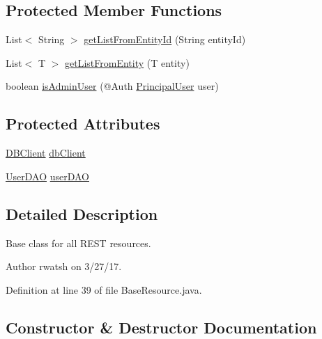 \subsection*{Protected Member Functions}
\begin{DoxyCompactItemize}
\item 
List$<$ String $>$ \hyperlink{classedu_1_1sjsu_1_1amigo_1_1user_1_1rest_1_1_base_resource_a54d169ff7906ac0b636c4577a09d79cd}{get\+List\+From\+Entity\+Id} (String entity\+Id)
\item 
List$<$ T $>$ \hyperlink{classedu_1_1sjsu_1_1amigo_1_1user_1_1rest_1_1_base_resource_aa035eb9e4d83221d9ac9eb937660a063}{get\+List\+From\+Entity} (T entity)
\item 
boolean \hyperlink{classedu_1_1sjsu_1_1amigo_1_1user_1_1rest_1_1_base_resource_a759e6d3b620efd2d6194f718b51e2501}{is\+Admin\+User} (@Auth \hyperlink{classedu_1_1sjsu_1_1amigo_1_1user_1_1auth_1_1_principal_user}{Principal\+User} user)
\end{DoxyCompactItemize}
\subsection*{Protected Attributes}
\begin{DoxyCompactItemize}
\item 
\hyperlink{interfaceedu_1_1sjsu_1_1amigo_1_1db_1_1common_1_1_d_b_client}{D\+B\+Client} \hyperlink{classedu_1_1sjsu_1_1amigo_1_1user_1_1rest_1_1_base_resource_a5f2d4befed6cbdcf6f0d9f4757875db5}{db\+Client}
\item 
\hyperlink{classedu_1_1sjsu_1_1amigo_1_1user_1_1db_1_1dao_1_1_user_d_a_o}{User\+D\+AO} \hyperlink{classedu_1_1sjsu_1_1amigo_1_1user_1_1rest_1_1_base_resource_a3bbc1d3a97b323849d429e68ba661fcc}{user\+D\+AO}
\end{DoxyCompactItemize}


\subsection{Detailed Description}
Base class for all R\+E\+ST resources.

\begin{DoxyAuthor}{Author}
rwatsh on 3/27/17. 
\end{DoxyAuthor}


Definition at line 39 of file Base\+Resource.\+java.



\subsection{Constructor \& Destructor Documentation}
\mbox{\label{classedu_1_1sjsu_1_1amigo_1_1user_1_1rest_1_1_base_resource_a6584afa97ace83ded9ab4d46378c2d6a}} 
